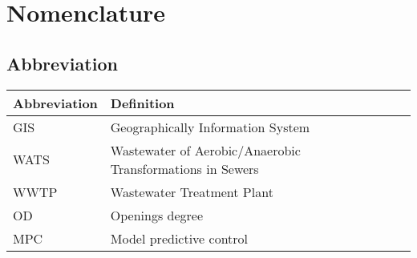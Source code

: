 \chapter*{Nomenclature}\label{ch:nomenclature}
\section*{Abbreviation}
\begin{longtable}[H]{p{80pt} p{300pt} p{40pt}}
\textbf{Abbreviation}	& \textbf{Definition} & \textbf{ } \\ \hline
GIS	  & Geographically Information System		&\\
WATS  & Wastewater of Aerobic/Anaerobic Transformations in Sewers &\\
WWTP  & Wastewater Treatment Plant &\\
OD    & Openings degree &\\
MPC   & Model predictive control &\\
\end{longtable}

